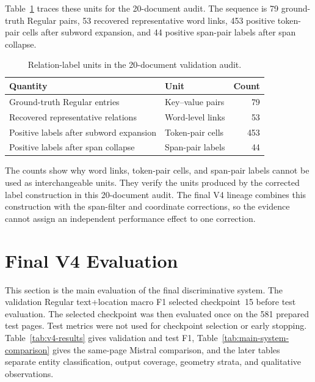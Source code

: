 Table~\ref{tab:diagnostic-verification} traces these units for the 20-document
audit. The sequence is 79 ground-truth Regular pairs, 53 recovered
representative word links, 453 positive token-pair cells after subword
expansion, and 44 positive span-pair labels after span collapse.

\begin{table}[ht]
  \centering
  \caption{Relation-label units in the 20-document validation audit.}
  \label{tab:diagnostic-verification}
  \begin{tabular}{@{}p{5.8cm}p{3.7cm}r@{}}
    \toprule
    \textbf{Quantity} & \textbf{Unit} & \textbf{Count} \\
    \midrule
    Ground-truth Regular entries & Key--value pairs & 79 \\
    Recovered representative relations & Word-level links & 53 \\
    Positive labels after subword expansion & Token-pair cells & 453 \\
    Positive labels after span collapse & Span-pair labels & 44 \\
    \bottomrule
  \end{tabular}
\end{table}

The counts show why word links, token-pair cells, and span-pair labels cannot be
used as interchangeable units. They verify the units produced by the corrected label construction in this
20-document audit.
The final V4 lineage combines this construction with the span-filter and
coordinate corrections, so the evidence cannot assign an independent
performance effect to one correction.

\section{Final V4 Evaluation}
\label{sec:exp8}

This section is the main evaluation of the final discriminative system. The
validation Regular text+location macro F1 selected checkpoint~15 before test
evaluation. The selected checkpoint was then evaluated once on the 581 prepared
test pages. Test metrics were not used for checkpoint selection or early
stopping. Table~\ref{tab:v4-results} gives validation and test F1,
Table~\ref{tab:main-system-comparison} gives the same-page Mistral comparison,
and the later tables separate entity classification, output coverage, geometry
strata, and qualitative observations.

